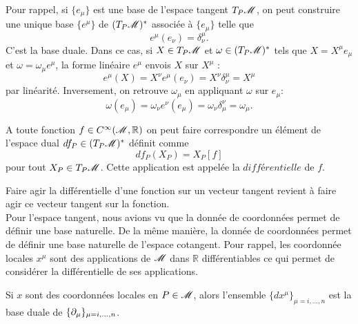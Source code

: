 \documentclass[a4paper,11pt]{report}
\begin{document}
                Pour rappel, si $\{e_\mu\}$ est une base de l'espace tangent $T_P\mathscr{M}$, on peut construire une unique base $\{e^\mu\}$ de $(T_P\mathscr{M})^*$ associée à $\{e_\mu\}$ telle que
                \begin{equation}
                    e^\mu(e_\nu) = \delta^\mu_\nu.
                \end{equation}
                C'est la base duale. Dans ce cas, si $X\in T_P\mathscr{M}$ et $\omega\in (T_P\mathscr{M})^*$ tels que $X = X^\mu e_\mu$ et $\omega = \omega_\mu e^\mu$, la forme linéaire $e^\mu$ envois $X$ sur $X^\mu$ :
                \begin{equation}
                    e^\mu(X) =  X^\nu e^\mu( e_\nu) = X^\nu \delta^\mu_\nu = X^\mu
                \end{equation}
                par linéarité. Inversement, on retrouve $\omega_\mu$ en appliquant $\omega$ sur $e_\mu$:
                \begin{equation}
                    \omega(e_\mu) = \omega_\nu e^\nu(e_\mu) = \omega_\nu \delta^\nu_\mu = \omega_\mu.
                \end{equation}
                
                \begin{defn}
                    A toute fonction $f\in C^\infty(\mathscr{M},\mathbb{R})$ on peut faire correspondre un élément de l'espace dual $df_P\in(T_P\mathscr{M})^*$ définit comme
                    \begin{equation}
                        df_P(X_P) = X_P[f]
                    \end{equation}
                    pour tout $X_P\in T_P\mathscr{M}$. Cette application est appelée la $\textit{différentielle}$ de $f$.
                \end{defn}
                Faire agir la différentielle d'une fonction sur un vecteur tangent revient à faire agir ce vecteur tangent sur la fonction.\\
                
                Pour l'espace tangent, nous avions vu que la donnée de coordonnées permet de définir une base naturelle. De la même manière, la donnée de coordonnées permet de définir une base naturelle de l'espace cotangent. Pour rappel, les coordonnée locales $x^\mu$ sont des applications de $\mathscr{M}$ dans $\mathbb{R}$ différentiables ce qui permet de considérer la différentielle de ses applications.
                
                \begin{prop}\begin{leftbar}
                    Si $x$ sont des coordonnées locales en $P\in\mathscr{M}$, alors l'ensemble $\{dx^\mu\}_{\mu=i,\dots,n}$ est la base duale de $\{\partial_\mu\}_{\mu=i,\dots,n}$.
                \end{leftbar}\end{prop}
                
\end{document}
